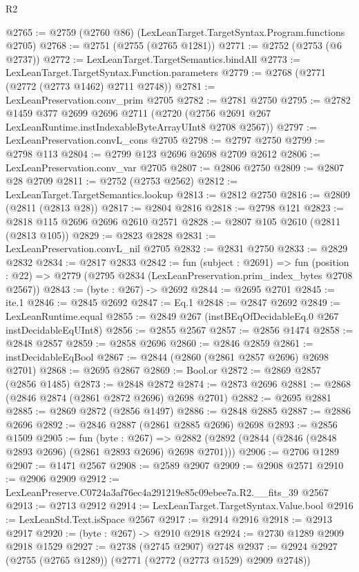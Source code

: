 \begin{lexlean}{R2}
\begin{coremodule}
@2765 := @2759 (@2760 @86) (LexLeanTarget.TargetSyntax.Program.functions @2705)
@2768 := @2751 (@2755 (@2765 @1281))
@2771 := @2752 (@2753 (@6 @2737))
@2772 := LexLeanTarget.TargetSemantics.bindAll
@2773 := LexLeanTarget.TargetSyntax.Function.parameters
@2779 := @2768 (@2771 (@2772 (@2773 @1462) @2711 @2748))
@2781 := LexLeanPreservation.conv_prim @2705
@2782 := @2781 @2750
@2795 := @2782
    @1459
    @377
    @2699
    @2696
    @2711
    (@2720 (@2756 @2691 @267 LexLeanRuntime.instIndexableByteArrayUInt8 @2708 @2567))
@2797 := LexLeanPreservation.convL_cons @2705
@2798 := @2797 @2750
@2799 := @2798 @113
@2804 := @2799 @123 @2696 @2698 @2709 @2612
@2806 := LexLeanPreservation.conv_var @2705
@2807 := @2806 @2750
@2809 := @2807 @28 @2709
@2811 := @2752 (@2753 @2562)
@2812 := LexLeanTarget.TargetSemantics.lookup
@2813 := @2812 @2750
@2816 := @2809 (@2811 (@2813 @28))
@2817 := @2804 @2816
@2818 := @2798 @121
@2823 := @2818 @115 @2696 @2696 @2610 @2571
@2828 := @2807 @105 @2610 (@2811 (@2813 @105))
@2829 := @2823 @2828
@2831 := LexLeanPreservation.convL_nil @2705
@2832 := @2831 @2750
@2833 := @2829 @2832
@2834 := @2817 @2833
@2842 := fun (subject : @2691) =>
  fun (position : @22) => @2779 (@2795 @2834 (LexLeanPreservation.prim_index_bytes @2708 @2567))
@2843 := (byte : @267) -> @2692
@2844 := @2695 @2701
@2845 := ite.{1}
@2846 := @2845 @2692
@2847 := Eq.{1}
@2848 := @2847 @2692
@2849 := LexLeanRuntime.equal
@2855 := @2849 @267 (instBEqOfDecidableEq.{0} @267 instDecidableEqUInt8)
@2856 := @2855 @2567
@2857 := @2856 @1474
@2858 := @2848 @2857
@2859 := @2858 @2696
@2860 := @2846 @2859
@2861 := instDecidableEqBool
@2867 := @2844 (@2860 (@2861 @2857 @2696) @2698 @2701)
@2868 := @2695 @2867
@2869 := Bool.or
@2872 := @2869 @2857 (@2856 @1485)
@2873 := @2848 @2872
@2874 := @2873 @2696
@2881 := @2868 (@2846 @2874 (@2861 @2872 @2696) @2698 @2701)
@2882 := @2695 @2881
@2885 := @2869 @2872 (@2856 @1497)
@2886 := @2848 @2885
@2887 := @2886 @2696
@2892 := @2846 @2887 (@2861 @2885 @2696) @2698
@2893 := @2856 @1509
@2905 := fun (byte : @267) =>
  @2882 (@2892 (@2844 (@2846 (@2848 @2893 @2696) (@2861 @2893 @2696) @2698 @2701)))
@2906 := @2706 @1289
@2907 := @1471 @2567
@2908 := @2589 @2907
@2909 := @2908 @2571
@2910 := @2906 @2909
@2912 := LexLeanPreserve.C0724a3af76ec4a291219e85c09ebee7a.R2.__fits_39 @2567
@2913 := @2713 @2912
@2914 := LexLeanTarget.TargetSyntax.Value.bool
@2916 := LexLeanStd.Text.isSpace @2567
@2917 := @2914 @2916
@2918 := @2913 @2917
@2920 := (byte : @267) -> @2910 @2918
@2924 := @2730 @1289 @2909 @2918 @1529
@2927 := @2738 (@2745 @2907) @2748
@2937 := @2924 @2927 (@2755 (@2765 @1289)) (@2771 (@2772 (@2773 @1529) @2909 @2748))

\end{coremodule}
\end{lexlean}
